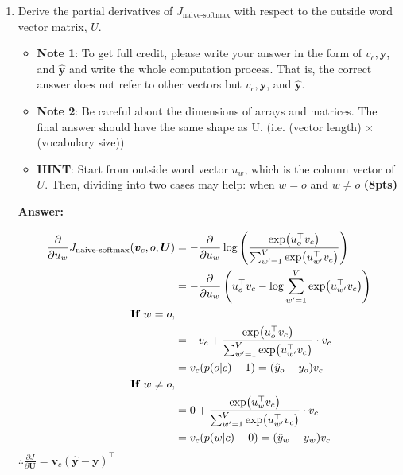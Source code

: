 \documentclass{assignment format}
\newenvironment{answer}{
    {\bf Answer:} \begingroup\color{red}
}{\endgroup}%
\begin{document}
\begin{enumerate}[label=(\alph*)]
\begin{answer}
$v_c$ is getting pulled toward the outside vector $u_o$ of the true outside word and pushed away from other outside vectors $u_w$, weighted by their predicted probabilities. Essentially, $v_c$  is being adjusted to become more similar to $u_o$ and less similar to other $u_w$    
\end{answer}  
    \item Derive the partial derivatives of $J_{\text{naive-softmax}}$ with respect to the outside word vector matrix, $U$.
    \begin{itemize} 
\item \textbf{Note 1}: To get full credit, please write your answer in the form of $v_c, \mathbf{y}$, and $\hat{\mathbf{y}}$ and write the whole computation process. That is, the correct answer does not refer to other vectors but $v_c, \mathbf{y}$, and $\hat{\mathbf{y}}$. 
\item \textbf{Note 2}: Be careful about the dimensions of arrays and matrices. The final answer should have the same shape as U. (i.e. (vector length) $\times$ (vocabulary size)) 
\item\textbf{HINT}: Start from outside word vector $u_w$, which is the column vector of $U$. Then, dividing into two cases may help: when $w=o$ and $w \neq o$ \textbf{(8pts)}
\end{itemize}
\begin{answer}
\begin{align*}
{\partial \over \partial u_{w}} J_{\text{naive-softmax}}(\bm{v}_c, o, \bm{U}) &= - {\partial \over \partial u_w } \log \left( \frac{\exp(u_o^\top v_c)}{\sum _{w'=1}^V \exp (u_{w'}^\top v_c)} \right) \\
&= - {\partial \over \partial u_{w}} \left( u_o^\top v_c - \log \sum_{w'=1}^V \exp(u_{w'}^\top v_c) \right) \\
\textbf{If } w = o, \\
&= -v_c + \frac{\exp(u_o^\top v_c)}{\sum_{w'=1}^V \exp(u_{w'}^\top v_c)} \cdot v_c \\
&= v_c(p(o|c) - 1) = (\hat{y}_o - y_o) v_c \\
\textbf{If } w \neq o, \\
&= 0 + \frac{\exp(u_w^\top v_c)}{\sum_{w'=1}^V \exp(u_{w'}^\top v_c)} \cdot v_c \\
&= v_c(p(w|c) - 0) = (\hat{y}_w - y_w) v_c \\
\end{align*}
$\therefore \frac{\partial J}{\partial \bm{U}} = \bm{v}_c (\hat{\mathbf{y}} - \mathbf{y})^\top$ 


    \end{answer}
\end{enumerate}
\end{document}
